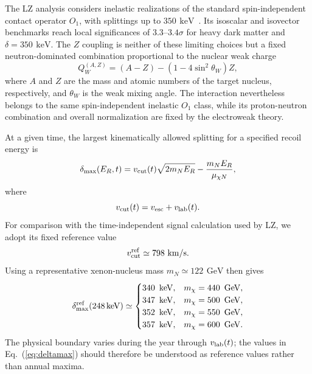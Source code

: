 \documentclass[aps,prd,twocolumn,nofootinbib,superscriptaddress]{revtex4-2}
\newcommand{\GeV}{\,\mathrm{GeV}}
\newcommand{\keV}{\,\mathrm{keV}}
\begin{document}
The LZ analysis considers inelastic realizations of the standard spin-independent contact operator $O_1$, with splittings up to $350~\keV$~\cite{LZ:2026}. Its isoscalar and isovector benchmarks reach local significances of $3.3$--$3.4\sigma$ for heavy dark matter and $\delta = 350~\keV$. The $Z$ coupling is neither of these limiting choices but a fixed neutron-dominated combination proportional to the nuclear weak charge
%
\begin{equation}
  Q_W^{(A,Z)} = (A-Z) - (1-4\sin^2\!\theta_W)Z,
\end{equation}
%
where $A$ and $Z$ are the mass and atomic numbers of the target nucleus, respectively, and $\theta_W$ is the weak mixing angle. The interaction nevertheless belongs to the same spin-independent inelastic $O_1$ class, while its proton-neutron combination and overall normalization are fixed by the electroweak theory.

At a given time, the largest kinematically allowed splitting for a specified recoil energy is
%
\begin{equation}
  \delta_{\max}(E_R,t) = v_{\rm cut}(t) \sqrt{2 m_N E_R} -\frac{m_N E_R}{\mu_{\chi N}},
\end{equation}
%
where
%
\begin{equation}
  v_{\rm cut}(t) = v_{\rm esc} + v_{\rm lab}(t).
\end{equation}
%
For comparison with the time-independent signal calculation used by LZ, we adopt its fixed reference value
%
\begin{equation}
  v_{\rm cut}^{\rm ref} \simeq 798~\mathrm{km/s}.
\end{equation}
%
Using a representative xenon-nucleus mass $m_N \simeq 122~\GeV$ then gives
%
\begin{equation}
  \delta_{\max}^{\rm ref}(248\keV) \simeq
  \begin{cases}
    340~\keV, & m_\chi = 440~\GeV,\\
    347~\keV, & m_\chi = 500~\GeV,\\
    352~\keV, & m_\chi = 550~\GeV,\\
    357~\keV, & m_\chi = 600~\GeV.
  \end{cases}
\label{eq:deltamax}
\end{equation}
%
The physical boundary varies during the year through $v_{\rm lab}(t)$; the values in Eq.~(\ref{eq:deltamax}) should therefore be understood as reference values rather than annual maxima.
\end{document}
